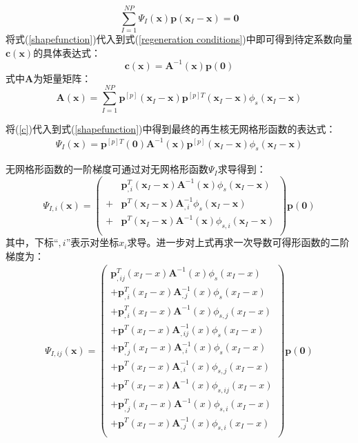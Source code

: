 \begin{equation}\label{regeneration conditions}
    \sum_{I=1}^{N\!P}\Psi_I(\pmb{x})\pmb{p}(\pmb{x}_I-\pmb{x})=\pmb{0}
\end{equation}
将式(\ref{shapefunction})代入到式(\ref{regeneration conditions})中即可得到待定系数向量$\pmb{c}(\pmb{x})$的具体表达式：
\begin{equation}\label{c}
    \pmb{c}(\pmb{x})=\pmb{A}^{-1}(\pmb{x})\pmb{p}(\pmb{0})
\end{equation}
式中$\pmb{A}$为矩量矩阵：
\begin{equation}
        \pmb{A}(\pmb{x})=\sum_{I=1}^{N\!P}\pmb{p}^{[p]}(\pmb{x}_I-\pmb{x})\pmb{p}^{[p]T}(\pmb{x}_I-\pmb{x})\phi_s(\pmb{x}_I-\pmb{x})
\end{equation}\par
将(\ref{c})代入到式(\ref{shapefunction})中得到最终的再生核无网格形函数的表达式：
\begin{equation}\label{Pshapefunction}
\begin{split}
        \Psi_I(\pmb{x})=\pmb{p}^{[p]T}(\pmb{0})\pmb{A}^{-1}(\pmb{x})\pmb{p}^{[p]}(\pmb{x}_I-\pmb{x})\phi_s(\pmb{x}_I-\pmb{x})
\end{split}
\end{equation}\par
无网格形函数的一阶梯度可通过对无网格形函数$\Psi_I$求导得到：
\begin{equation}
    \Psi_{I,i}(\pmb{x})=\left ( \begin{aligned}
    &\pmb p_{,i}^{T}(\pmb x_I-\pmb x)\pmb A^{-1}(\pmb x)\phi_s(\pmb x_I-\pmb x)\\
    +&\pmb p^{T}(\pmb x_I-\pmb x)\pmb A_{,i}^{-1}\phi_s(\pmb x_I-\pmb x)\\
    +&\pmb p^{T}(\pmb x_I-\pmb x)\pmb A^{-1}(\pmb x)\phi _{s,i}(\pmb x_I-\pmb x)\\
    \end{aligned} \right)
    \pmb p(\pmb 0)
\end{equation}
其中，下标“$,i$”表示对坐标$x_i$求导。进一步对上式再求一次导数可得形函数的二阶梯度为：
\begin{equation}
\begin{split}
    \Psi_{I,ij}(\pmb{x})=\left(\begin{matrix}
    \pmb p_{,ij}^{T}(x_I-x)\pmb A^{-1}(x)\phi_s(x_I-x)\\
    +\pmb p_{,i}^{T}(x_I-x)\pmb A_{,j}^{-1}(x)\phi_s(x_I-x)\\
    +\pmb p_{,i}^{T}(x_I-x)\pmb A^{-1}(x)\phi_{s,j}(x_I-x)\\
    +\pmb p^{T}(x_I-x)\pmb A_{,ij}^{-1}(x)\phi_s(x_I-x)\\
    +\pmb p_{,j}^{T}(x_I-x)\pmb A_{,i}^{-1}(x)\phi_s(x_I-x)\\
    +\pmb p^{T}(x_I-x)\pmb A_{,i}^{-1}(x)\phi_{s,j}(x_I-x)\\
    +\pmb p^{T}(x_I-x)\pmb A^{-1}(x)\phi_{s,ij}(x_I-x)\\
    +\pmb p_{,j}^{T}(x_I-x)\pmb A^{-1}(x)\phi_{s,i}(x_I-x)\\
    +\pmb p^{T}(x_I-x)\pmb A_{,j}^{-1}(x)\phi_{s,i}(x_I-x)\\
    \end{matrix}\right)
    \pmb p(\pmb 0)
\end{split}
\end{equation}
